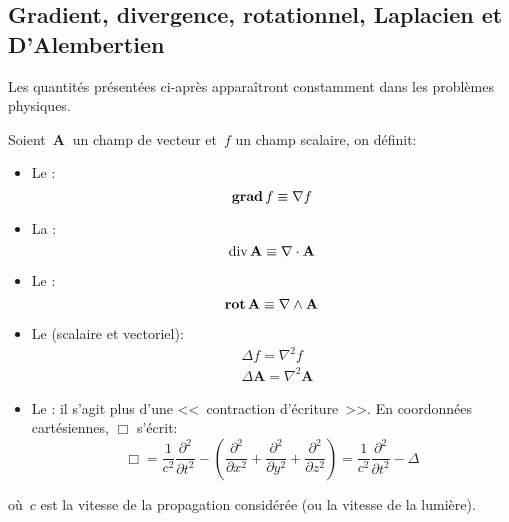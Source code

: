 \medskip
\subsection{Gradient, divergence, rotationnel, Laplacien et D'Alembertien}
Les quantités présentées ci-après apparaîtront constamment dans les
problèmes physiques.%



\medskip
Soient~$\mathbf{A}~$ un champ de vecteur et~$f$ un champ scalaire, on définit:
\begin{itemize}
\item Le :
\begin{equation} \operatorname{\mathbf{grad}} f \equiv \nabla f \end{equation}

\item La :
\begin{equation} \operatorname{div} \mathbf{A} \equiv \nabla\cdot\mathbf{A} \end{equation}

\item Le :
\begin{equation} \operatorname{\mathbf{rot}} \mathbf{A} \equiv \nabla \wedge \mathbf{A} \end{equation}

\item Le  (scalaire et vectoriel):
\begin{align} &\Delta f = \nabla^2 f\\
&\Delta \mathbf{A} = \nabla^2 \mathbf{A} \end{align}

\item Le : il s'agit plus d'une <<~contraction d'écriture~>>.
En coordonnées cartésiennes, $\Box$ s'écrit:
\begin{equation}
  \Box = \frac{1}{c^2}\frac{\partial^2}{\partial t^2} - \left(\frac{\partial^2}{\partial x^2} + \frac{\partial^2}{\partial y^2} + \frac{\partial^2}{\partial z^2}\right)
  = \frac{1}{c^2}\frac{\partial^2}{\partial t^2} - \Delta
\end{equation}
\end{itemize}
où~$c$ est la vitesse de la propagation considérée (ou la vitesse de la lumière).

